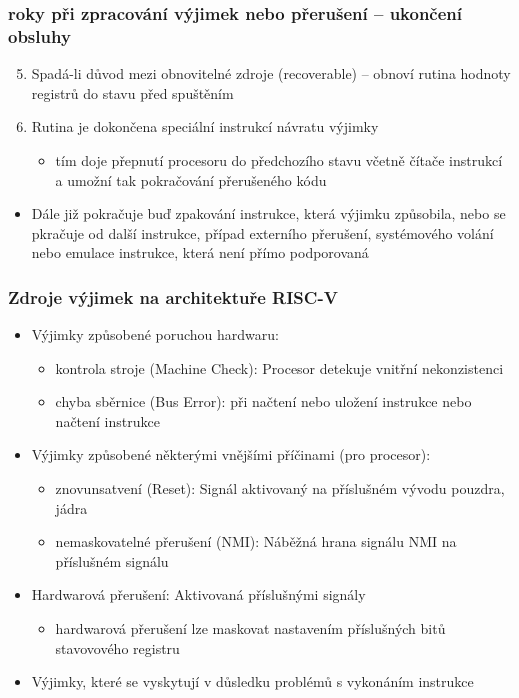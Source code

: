 \documentclass{beamer}
\begin{document}
\begin{frame}
\frametitle{roky při zpracování výjimek nebo přerušení -- ukončení obsluhy}

\begin{enumerate}
 \setcounter{enumi}{4}
 \item Spadá-li důvod mezi obnovitelné zdroje (recoverable) -- obnoví rutina hodnoty registrů do stavu před spuštěním
 \item Rutina je dokončena speciální instrukcí návratu výjimky
 \begin{itemize}
  \item tím doje přepnutí procesoru do předchozího stavu včetně čítače instrukcí a umožní tak pokračování
        přerušeného kódu
 \end{itemize}
\end{enumerate}
\begin{itemize}
 \item Dále již pokračuje buď zpakování instrukce, která výjimku způsobila, nebo se pkračuje od další instrukce,
       případ externího přerušení, systémového volání nebo emulace instrukce, která není přímo podporovaná
\end{itemize}
\end{frame}

\begin{frame}
\frametitle{Zdroje výjimek na architektuře RISC-V}

\begin{itemize}
 \item Výjimky způsobené poruchou hardwaru:
 \begin{itemize}
  \item kontrola stroje (Machine Check): Procesor detekuje vnitřní nekonzistenci
  \item chyba sběrnice (Bus Error): při načtení nebo uložení instrukce nebo načtení instrukce
 \end{itemize}
 \item Výjimky způsobené některými vnějšími příčinami (pro procesor):
 \begin{itemize}
  \item znovunsatvení (Reset): Signál aktivovaný na příslušném vývodu pouzdra, jádra
  \item nemaskovatelné přerušení (NMI): Náběžná hrana signálu NMI na příslušném signálu
 \end{itemize}
 \item Hardwarová přerušení: Aktivovaná příslušnými signály
 \begin{itemize}
  \item hardwarová přerušení lze maskovat nastavením příslušných bitů stavovového registru
 \end{itemize}
 \item Výjimky, které se vyskytují v důsledku problémů s vykonáním instrukce
\end{itemize}
\end{frame}
\end{document}
